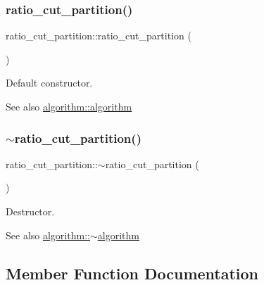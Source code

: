 \subsubsection{\texorpdfstring{ratio\+\_\+cut\+\_\+partition()}{ratio\_cut\_partition()}}
{\footnotesize\ttfamily ratio\+\_\+cut\+\_\+partition\+::ratio\+\_\+cut\+\_\+partition (\begin{DoxyParamCaption}{ }\end{DoxyParamCaption})}

Default constructor.

\begin{DoxySeeAlso}{See also}
\mbox{\hyperlink{classalgorithm_ab79e1ddec2f2afdf4b36b10724db8b15}{algorithm\+::algorithm}} 
\end{DoxySeeAlso}
\mbox{\label{classratio__cut__partition_a5fe4f3a926fd07a1af46cce9acdbb849}} 
\subsubsection{\texorpdfstring{$\sim$ratio\+\_\+cut\+\_\+partition()}{~ratio\_cut\_partition()}}
{\footnotesize\ttfamily ratio\+\_\+cut\+\_\+partition\+::$\sim$ratio\+\_\+cut\+\_\+partition (\begin{DoxyParamCaption}{ }\end{DoxyParamCaption})\hspace{0.3cm}{\ttfamily [virtual]}}

Destructor.

\begin{DoxySeeAlso}{See also}
\mbox{\hyperlink{classalgorithm_adca9b1e7fa3afd914519a9dbb44e9fd5}{algorithm\+::$\sim$algorithm}} 
\end{DoxySeeAlso}


\subsection{Member Function Documentation}
\mbox{\label{classratio__cut__partition_a469c613c69db19cb63e492075346fea2}} 
